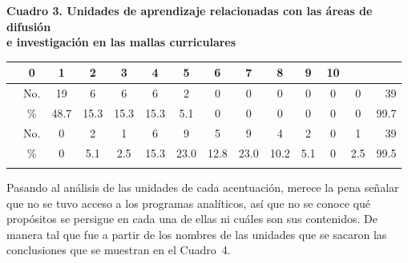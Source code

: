 \bigskip
\begin{scriptsize}
\textbf{Cuadro 3. Unidades de aprendizaje
relacionadas con las áreas de difusión\\ e investigación en las mallas  
curriculares}
\end{scriptsize}

\medskip
\begin{center}
\begin{scriptsize}
\tablefirsthead{}
\tablehead{}
\tabletail{}
\tablelasttail{}
\setlength{\extrarowheight}{1.5pt}
\begin{supertabular}{m{18mm}ccccccccccccr}
\hline%

&
0 & 1 & 2 & 3 & 4 & 5 & 6 & 7 & 8 & 9 & 10 & \\\hline
{} & No. & 19 & 6 & 6 & 6 & 2 & 0 & 0 & 0 & 0 & 0 & 0 & 39 \\%
 & {\scriptsize \%} &
48.7 &
15.3 &
15.3 &
15.3 &
5.1 &
0 &
0 &
0 &
0 &
0 &
0 & 
99.7 \\\hline
{} &
{\scriptsize No.} &
0 &
2 &
1 &
6 &
9 &
5 &
9 &
4 &
2 &
0 &
1 & 
39 \\%
{}
 & {\scriptsize \%} &
0 &
5.1 &
2.5 &
15.3 &
23.0 &
12.8 &
23.0 &
10.2 &
5.1 &
0 &
2.5 &
99.5\\\hline\hline%
\hhline{--------------}
\\%
\end{supertabular}
\end{scriptsize}
\end{center}


\bigskip
Pasando al análisis de las unidades de cada acentuación, merece la pena 
señalar que no se tuvo acceso a los programas analíticos, así que no se 
conoce qué propósitos se persigue en cada una de ellas ni cuáles son sus 
contenidos. De manera tal que fue a partir de los nombres de las unidades 
que se sacaron las conclusiones que se muestran en el Cuadro~4.
\newpage

